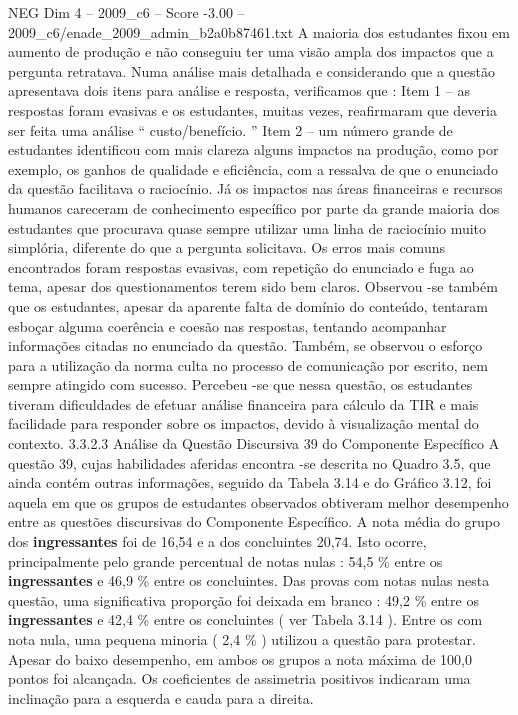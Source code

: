 \begin{textsample}{NEG Dim 4 – 2009\_c6 – Score -3.00 – 2009\_c6/enade\_2009\_admin\_b2a0b87461.txt}
A maioria dos estudantes fixou em aumento de produção e não conseguiu ter uma visão ampla dos impactos que a pergunta retratava.
Numa análise mais detalhada e considerando que a questão apresentava dois itens para análise e resposta, verificamos que : Item 1 – as respostas foram evasivas e os estudantes, muitas vezes, reafirmaram que deveria ser feita uma análise “ custo/benefício. ” Item 2 – um número grande de estudantes identificou com mais clareza alguns impactos na produção, como por exemplo, os ganhos de qualidade e eficiência, com a ressalva de que o enunciado da questão facilitava o raciocínio.
Já os impactos nas áreas financeiras e recursos humanos careceram de conhecimento específico por parte da grande maioria dos estudantes que procurava quase sempre utilizar uma linha de raciocínio muito simplória, diferente do que a pergunta solicitava.
Os erros mais comuns encontrados foram respostas evasivas, com repetição do enunciado e fuga ao tema, apesar dos questionamentos terem sido bem claros.
Observou -se também que os estudantes, apesar da aparente falta de domínio do conteúdo, tentaram esboçar alguma coerência e coesão nas respostas, tentando acompanhar informações citadas no enunciado da questão.
Também, se observou o esforço para a utilização da norma culta no processo de comunicação por escrito, nem sempre atingido com sucesso.
Percebeu -se que nessa questão, os estudantes tiveram dificuldades de efetuar análise financeira para cálculo da TIR e mais facilidade para responder sobre os impactos, devido à visualização mental do contexto. 3.3.2.3 Análise da Questão Discursiva 39 do Componente Específico A questão 39, cujas habilidades aferidas encontra -se descrita no Quadro 3.5, que ainda contém outras informações, seguido da Tabela 3.14 e do Gráfico 3.12, foi aquela em que os grupos de estudantes observados obtiveram melhor desempenho entre as questões discursivas do Componente Específico.
A nota média do grupo dos \textbf{ingressantes} foi de 16,54 e a dos concluintes 20,74.
Isto ocorre, principalmente pelo grande percentual de notas nulas : 54,5 \% entre os \textbf{ingressantes} e 46,9 \% entre os concluintes.
Das provas com notas nulas nesta questão, uma significativa proporção foi deixada em branco : 49,2 \% entre os \textbf{ingressantes} e 42,4 \% entre os concluintes ( ver Tabela 3.14 ).
Entre os com nota nula, uma pequena minoria ( 2,4 \% ) utilizou a questão para protestar.
Apesar do baixo desempenho, em ambos os grupos a nota máxima de 100,0 pontos foi alcançada.
Os coeficientes de assimetria positivos indicaram uma inclinação para a esquerda e cauda para a direita.

\end{textsample}
